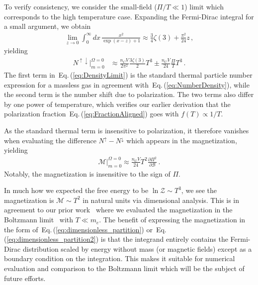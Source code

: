 \documentclass[epjST]{svjour}
\newcommand{\req}[1]{Eq.\,(\ref{#1})}
\begin{document}
{To verify consistency, we consider the small-field (\(\Pi/T\ll 1\)) limit which corresponds to the high temperature case. Expanding the Fermi-Dirac integral for a small argument, we obtain
\begin{align}
\lim_{z\to0}\int_{0}^{\infty} dx\,\frac{x^{2}}{\exp\left(x-z\right)+1} \approx \frac{3}{4}\zeta(3)+\frac{\pi^2}{24}z\,,
\end{align}
yielding
\begin{align}
\label{eq:DensityLimit}
N^{\uparrow\downarrow}\vert_{m=0}^{\Omega=0} &\approx \frac{n_{C}V}{2\pi^{2}}\frac{3\zeta(3)}{2}T^3 \pm \frac{n_{\mathrm{C}}V}{24}\frac{\Pi}{T}T^3\,.
\end{align}
The first term in~\req{eq:DensityLimit} is the standard thermal particle number expression for a massless gas in agreement with~\req{eq:NumberDensity}, while the second term is the number shift due to polarization. The two terms also differ by one power of temperature, which verifies our earlier derivation that the polarization fraction~\req{eq:FractionAligned} goes with \(f(T)\propto1/T\).

As the standard thermal term is insensitive to polarization, it therefore vanishes when evaluating the difference \(N^{\uparrow}-N^{\downarrow}\) which appears in the magnetization, yielding
\begin{align}
\label{eq:FinalMag}
\mathcal{M}\vert_{m=0}^{\Omega=0} \approx \frac{n_\mathrm{C}V}{24}T^2\frac{\partial\Pi^2}{\partial\mathcal{B}}\,.
\end{align}
Notably, the magnetization is insensitive to the sign of \(\Pi\).} In much how we expected the free energy to be \(\ln\mathcal{Z}\sim T^{3}\), we see the magnetization is \(\mathcal{M}\sim T^{2}\) in natural units via dimensional analysis. This is in agreement to our prior work~\cite{Steinmetz:2023nsc,Steinmetz:2023ucp} where we evaluated the magnetization in the Boltzmann limit~\cite{Steinmetz:2023nsc} with \(T\ll m_e\). The benefit of expressing the magnetization in the form of~\req{eq:dimensionless_partition} or~\req{eq:dimensionless_partition2} is that the integrand entirely contains the Fermi-Dirac distribution scaled by energy without mass (or magnetic fields) except as a boundary condition on the integration. This makes it suitable for numerical evaluation and comparison to the Boltzmann limit which will be the subject of future efforts.

\end{document}
